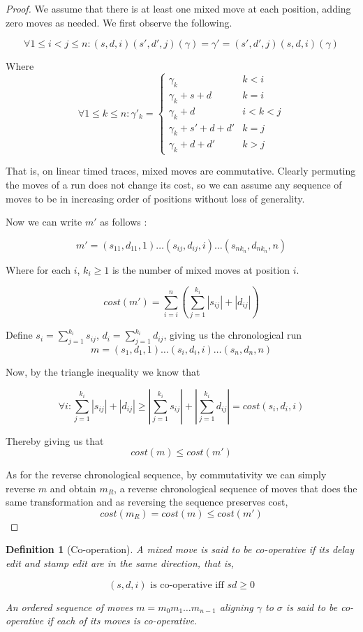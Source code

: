 \documentclass{article}
\newcounter{cases}
\theoremstyle{Definition}
\newtheorem{definition}{Definition}
\theoremstyle{definition}
\begin{document}
			\begin{proof}
		We assume that there is at least one mixed move at each position, adding zero moves as needed. We first observe the following. 
		
		$$\forall 1 \leq i < j \leq n : (s, d, i)(s', d', j)(\gamma) = \gamma' = (s', d', j)(s, d, i)(\gamma)$$
		
		Where $$\forall 1 \leq k \leq n : \gamma'_k = \begin{cases}
			\gamma_k & k <i \\
			\gamma_k + s + d & k = i \\
			\gamma_k + d & i < k < j \\
			\gamma_k + s' + d + d' & k = j \\
			\gamma_k + d + d' & k > j
		\end{cases}$$
		
		That is, on linear timed traces, mixed moves are commutative. 
		Clearly permuting the moves of a run does not change its cost, so we can assume any sequence of moves to be in increasing order of positions without loss of generality.
		
		Now we can write $m'$ as follows : 
		
		$$m' = (s_{11}, d_{11}, 1)\dots (s_{ij}, d_{ij}, i)\dots(s_{nk_n}, d_{nk_n}, n)$$ 
		
		Where for each $i$, $k_i \geq 1$ is the number of mixed moves at position $i$. 
		
		$$cost(m') = \sum_{i = i}^{n} (\sum_{j = 1}^{k_i} |s_{ij}| + |d_{ij}|)$$ 
		
		Define $s_i = \sum_{j = 1}^{k_i} s_{ij}$, $d_i =\sum_{j = 1}^{k_i} d_{ij}$, giving us the chronological run $$m = (s_1, d_1, 1)\dots (s_i, d_i, i)\dots (s_n, d_n, n)$$
		
		Now, by the triangle inequality we know that 
		
		$$\forall i : \sum_{j = 1}^{k_i} |s_{ij}| + |d_{ij}| \geq | \sum_{j = 1}^{k_i} s_{ij} | + | \sum_{j = 1}^{k_i} d_{ij} | = cost(s_i, d_i, i) $$
		
		Thereby giving us that $$cost(m) \leq cost(m')$$ 
		
		As for the reverse chronological sequence, by commutativity we can simply reverse $m$ and obtain $m_R$, a reverse chronological sequence of moves that does the same transformation and as reversing the sequence preserves cost, $$cost(m_R) = cost(m) \leq cost(m')$$ 
	\end{proof}
	
	\begin{definition}[Co-operation]
	A mixed move is said to be co-operative if its delay edit and stamp edit are in the same direction, that is, 
	
	$$(s, d, i) \textrm{ is co-operative iff } sd \geq 0$$
	
	An ordered sequence of moves $m = m_0m_1\dots m_{n-1}$ aligning $\gamma$ to $\sigma$ is said to be \textit{co-operative} if each of its moves is co-operative. \\
	
	\end{definition}
\end{document}
